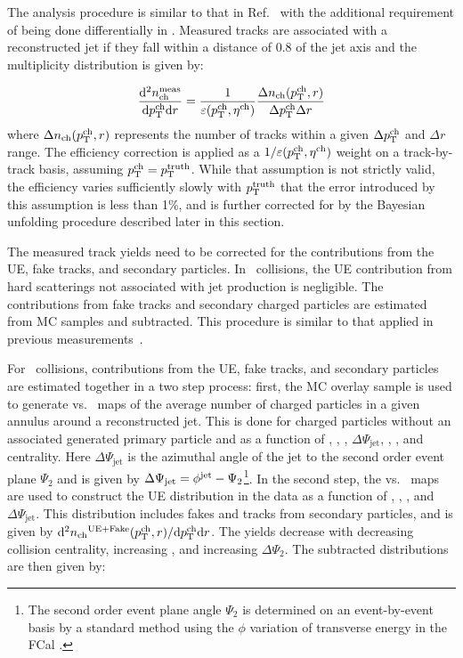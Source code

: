 
The analysis procedure is similar to that in Ref.~\cite{Aaboud:2018hpb} with the additional requirement of being done differentially in \rvar.
Measured tracks are associated with a reconstructed jet if they fall within a distance of $0.8$ of the jet axis and the multiplicity distribution is given by:

\begin{align*}
\dfrac{\mathrm{d}^{2} \mbox{$n_{\mathrm{ch}}^{\mathrm{meas}}$} }{ \mathrm{d} \mbox{$p_{\mathrm{T}}^{\mathrm{ch}}$} \mathrm{d} r} = \frac{1}{\varepsilon(\mbox{$p_{\mathrm{T}}^{\mathrm{ch}}$},\mbox{$\eta^{\mathrm{ch}}$})} \frac{\Delta \mbox{$n_{\mathrm{ch}}$}( \mbox{$p_{\mathrm{T}}^{\mathrm{ch}}$}, r)}{ \Delta\mbox{$p_{\mathrm{T}}^{\mathrm{ch}}$} \Delta r}
\end{align*}
where $\Delta \mbox{$n_{\mathrm{ch}}$} (\mbox{$p_{\mathrm{T}}^{\mathrm{ch}}$}, r)$ represents the number of tracks within a given $\Delta \mbox{$p_{\mathrm{T}}^{\mathrm{ch}}$}$ and $\Delta r$ range.
The efficiency correction is applied as a $1/\varepsilon(\mbox{$p_{\mathrm{T}}^{\mathrm{ch}}$},\mbox{$\eta^{\mathrm{ch}}$})$ weight on a track-by-track basis, assuming $\mbox{$p_{\mathrm{T}}^{\mathrm{ch}}$} = \mbox{$p_{\mathrm{T}}^{\mathrm{truth}}$}$.
While that assumption is not strictly valid, the efficiency varies sufficiently slowly with $\mbox{$p_{\mathrm{T}}^{\mathrm{truth}}$}$ that the error introduced by this assumption is less than 1\%, and is further corrected for by the Bayesian unfolding procedure described later in this section.

The measured track yields need to be corrected for the contributions from the UE, fake tracks, and secondary particles.
In \pp\ collisions, the UE contribution from hard scatterings not associated with jet production is negligible.
The contributions from fake tracks and secondary charged particles are estimated from MC samples and subtracted.
This procedure is similar to that applied in previous measurements~\cite{Aaboud:2017tke,Aaboud:2018hpb}.

For \pbpb\ collisions, contributions from the UE, fake tracks, and secondary particles are estimated together in a two step process:
first, the MC overlay sample is used to generate \etajet vs. \phijet\ maps of the average number of charged particles in a given annulus around a reconstructed jet.
This is done for charged particles without an associated generated primary particle and as a function of \ptjet, \etajet, \phijet,  $\Delta\Psi_{\mathrm{jet}}$, \rvar, \pttrk, and centrality.
Here $\Delta\Psi_{\mathrm{jet}}$ is the azimuthal angle of the jet to the second order event plane $\Psi_2$ and is given by $ \Delta\Psi_{\mathrm{jet}} = \mbox{$\phi^{\mathrm{jet}}$} - \Psi_2$\footnote{The second order event plane angle $\Psi_2$ is determined on an event-by-event basis by a standard method using the $\phi$ variation of transverse energy in the FCal \cite{ATLAS:2012at}.}.
In the second step, the \etajet vs. \phijet\ maps are used to construct the UE distribution in the data as a function of \ptjet, \etajet, \phijet, and $\Delta\Psi_{\mathrm{jet}}$.
This distribution includes fakes and tracks from secondary particles, and is given by \mbox{$\mathrm{d}^2 \mbox{$n_{\mathrm{ch}}$}^{\mathrm{UE+Fake}}(\mbox{$p_{\mathrm{T}}^{\mathrm{ch}}$}, r) / \mathrm{d} \mbox{$p_{\mathrm{T}}^{\mathrm{ch}}$} \mathrm{d} r$}.
The yields decrease with decreasing collision centrality, increasing \pttrk, and increasing $\Delta\Psi_2$.
The subtracted distributions are then given by:

